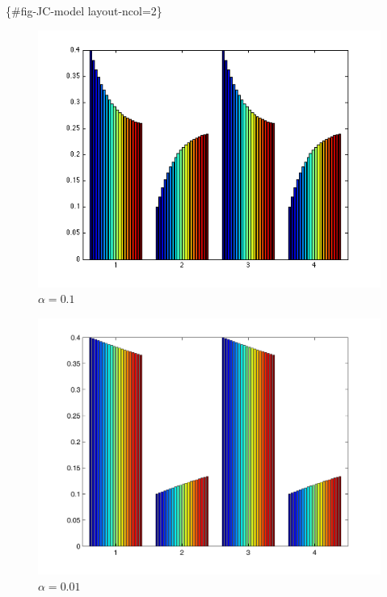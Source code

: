 \documentclass[
  letterpaper,
  DIV=11,
  numbers=noendperiod]{scrreprt}
\begin{document}
\{\#fig-JC-model layout-ncol=2\}

\begin{figure}[H]

{\centering \includegraphics{figs/base_sub_01.png}

}

\caption{\(\alpha = 0.1\)}

\end{figure}%
\begin{figure}[H]

{\centering \includegraphics{figs/base_sub_001.png}

}

\caption{\(\alpha = 0.01\)}

\end{figure}%
\end{document}
